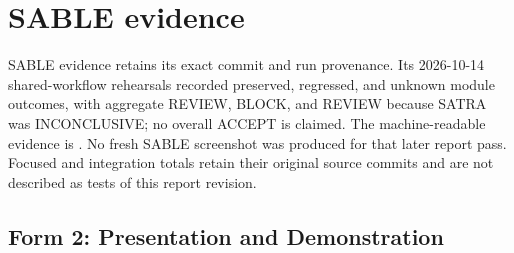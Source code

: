 \section{SABLE evidence}
SABLE evidence retains its exact commit and run provenance. Its 2026-10-14 shared-workflow rehearsals recorded preserved, regressed, and unknown module outcomes, with aggregate REVIEW, BLOCK, and REVIEW because SATRA was INCONCLUSIVE; no overall ACCEPT is claimed. The machine-readable evidence is . No fresh SABLE screenshot was produced for that later report pass. Focused and integration totals retain their original source commits and are not described as tests of this report revision.

\subsection{Form 2: Presentation and Demonstration}
\small
